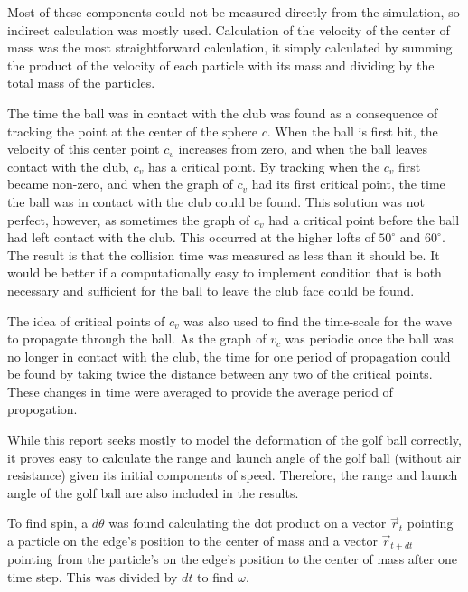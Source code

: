 \documentclass{article}
\begin{document}
Most of these components could not be measured directly from the simulation, so indirect calculation was mostly used. Calculation of the velocity of the center of mass was the most straightforward calculation, it simply calculated by summing the product of the velocity of each particle with its mass and dividing by the total mass of the particles. 

The time the ball was in contact with the club was found as a consequence of tracking the point at the center of the sphere $c$. When the ball is first hit, the velocity of this center point $c_v$ increases from zero, and when the ball leaves contact with the club, $c_v$ has a critical point. By tracking when the $c_v$ first became non-zero, and when the graph of $c_v$ had its first critical point, the time the ball was in contact with the club could be found. This solution was not perfect, however, as sometimes the graph of $c_v$ had a critical point before the ball had left contact with the club. This occurred at the higher lofts of $50^{\circ}$ and $60^{\circ}$. The result is that the collision time was measured as less than it should be. It would be better if a computationally easy to implement condition that is both necessary and suf\mbox{f}icient for the ball to leave the club face could be found.

The idea of critical points of $c_v$ was also used to find the time-scale for the wave to propagate through the ball. As the graph of $v_c$ was periodic once the ball was no longer in contact with the club, the time for one period of propagation could be found by taking twice the distance between any two of the critical points. These changes in time were averaged to provide the average period of propogation.

While this report seeks mostly to model the deformation of the golf ball correctly, it proves easy to calculate the range and launch angle of the golf ball (without air resistance) given its initial components of speed. Therefore, the range and launch angle of the golf ball are also included in the results.

To find spin, a $d\theta$ was found calculating the dot product on a vector $\vec{r}_{t}$ pointing a particle on the edge's position to the center of mass and a vector $\vec{r}_{t + dt}$ pointing from the particle's on the edge's position to the center of mass after one time step. This was divided by $dt$ to find $\omega$.
\end{document}
